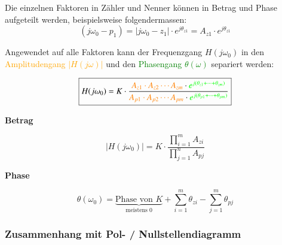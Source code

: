 Die einzelnen Faktoren in Zähler und Nenner können in Betrag und Phase aufgeteilt werden, beispielsweise folgendermassen:
$$ (j \omega_0 - p_1) = |j \omega_0 - z_1| \cdot e^{j \theta_{z1}} = A_{z1} \cdot e^{j \theta_{z1}} $$



Angewendet auf alle Faktoren kann der Frequenzgang $H(j \omega_0)$ in den \textcolor{orange}{Amplitudengang $|H(j \omega)|$} und den
\textcolor{green}{Phasengang $\theta(\omega)$} separiert werden:

$$ \boxed{ H(j \omega_0) = K \cdot \frac{\textcolor{orange}{A_{z1} \cdot A_{z2} \cdots A_{zm}} \cdot \textcolor{green}{e^{j(\theta_{z1} + \cdots + \theta_{zm})}}}
                                        {\textcolor{orange}{A_{p1} \cdot A_{p2} \cdots A_{pm}} \cdot \textcolor{green}{e^{j(\theta_{p1} + \cdots + \theta_{pm})}}} } $$

\vspace{0.2cm}
\begin{minipage}[t]{0.48\columnwidth}
    \begin{center}
        \textbf{Betrag}
    \end{center}
    \vspace{-0.2cm}
    $$ \boxed{ | H(j \omega_0) | = K \cdot \frac{\prod_{i=1}^{m} A_{zi}}{\prod_{j=1}^{n} A_{pj}} } $$
\end{minipage}
\hfill
\begin{minipage}[t]{0.48\columnwidth}
    \begin{center}
        \textbf{Phase}
    \end{center}
    \vspace{-0.2cm}
    $$ \boxed{ \theta(\omega_0) = \underbrace{\text{Phase von } K}_{\text{meistens } 0} + \sum_{i=1}^{m} \theta_{zi} - \sum_{j=1}^{m} \theta_{pj} } $$
\end{minipage}


\subsubsection{Zusammenhang mit Pol- / Nullstellendiagramm}

